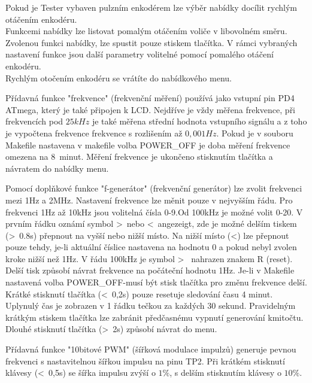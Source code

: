 Pokud je Tester vybaven pulzním enkodérem lze výběr nabídky docílit rychlým otáčením enkodéru.\\
Funkcemi nabídky lze listovat pomalým otáčením voliče v libovolném směru.
Zvolenou funkci nabídky, lze spustit pouze stiskem tlačítka. V rámci vybraných nastavení funkce jsou další parametry volitelné pomocí pomalého otáčení enkodéru.\\
Rychlým otočením enkodéru se vrátíte do nabídkového menu.
\begin{description}
\vspace{-0.3cm}
 \item[Frekvence]
Přídavná funkce "frekvence" (frekvenční měření) používá jako vstupní pin PD4 ATmega, který je také připojen k LCD.
Nejdříve je vždy měřena frekvence, při frekvencích pod \(25kHz\) je  také měřena střední hodnota vstupního signálu a z toho je vypočtena frekvence frekvence s rozlišením až \(0,001Hz\).
Pokud je v souboru Makefile nastavena v makefile volba POWER\_OFF  je doba měření frekvence omezena na  8~minut.
Měření frekvence je ukončeno stisknutím tlačítka a návratem do nabídky menu.
\vspace{-0.3cm}
 \item[f-generátor]
Pomocí doplňkové funkce "f-generátor" (frekvenční generátor) lze zvolit frekvenci mezi 1Hz a 2MHz.
Nastavení frekvence lze měnit pouze v nejvyšším řádu.
Pro frekvenci 1Hz až 10kHz jsou volitelná čísla 0-9.Od 100kHz je možné volit 0-20.
V prvním řádku oznámí symbol \textgreater~nebo \textless~angezeigt, zde je možné delším tiskem
(\textgreater~0.8s) přepnout na vyšší nebo nižší místo.
Na nižší místo (\textless) lze přepnout pouze tehdy, je-li aktuální číslice nastavena na hodnotu 0
a pokud nebyl zvolen kroke nižší než 1Hz.
V řádu 100kHz je symbol \textgreater~  nahrazen znakem R (reset). Delší tisk způsobí
návrat frekvence na počáteční hodnotu 1Hz.
Je-li v Makefile nastavená volba POWER\_OFF-musí být stisk tlačítka pro změnu frekvence delší.
Krátké stisknutí tlačítka (\textless~0,2s) pouze resetuje sledování času 4 minut.
Uplynulý čas je zobrazen v 1 řádku tečkou za každých 30 sekund.
Pravidelným krátkým stiskem tlačítka lze zabránit předčasnému vypnutí generování kmitočtu.
Dlouhé stisknutí tlačítka (\textgreater~2s) způsobí návrat do menu.
\vspace{-0.3cm}
 \item[10-bit PWM]
Přídavná funkce "10bitové PWM" (šířková modulace impulzů) generuje pevnou frekvenci s nastavitelnou šířkou impulsu na pinu TP2.
Při krátkém stisknutí klávesy (\textless~0,5s) se šířka impulsu zvýší o \(1\%\),  s delším stisknutím klávesy o \(10\%\).\\

\end{description}
